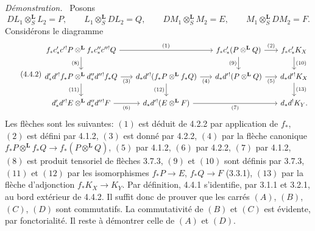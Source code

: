 \documentclass[11pt]{article}
\newenvironment{prooftext}[1][Proof]{\par\noindent\emph{#1.}\ }{\par\medskip}
\begin{document}
\begin{prooftext}[Démonstration]
Posons
\[
DL_1\otimes_S^{\mathbf L}L_2=P,\qquad
L_1\otimes_S^{\mathbf L}DL_2=Q,\qquad
DM_1\otimes_S^{\mathbf L}M_2=E,\qquad
M_1\otimes_S^{\mathbf L}DM_2=F.
\]
Considérons le diagramme
\begin{equation}
\tag{4.4.2}
\begin{tikzcd}[column sep=1.6em,row sep=1.7em]
f_*c'_*c'{}^!P\otimes^{\mathbf L} f_*c''_*c''{}^!Q
 \arrow[rr,"(1)"] \arrow[d,"(8)"'] &&
f_*c'_*(P\otimes^{\mathbf L}Q)
 \arrow[r,"(2)"] \arrow[d,"(9)"'] &
f_*c'_*K_X \arrow[d,"(10)"] \\
d'_*d'{}^!f_*P\otimes^{\mathbf L} d''_*d''{}^!f_*Q
 \arrow[r,"(3)"'] \arrow[d,"(11)"'] &
d_*d'{}^!(f_*P\otimes^{\mathbf L} f_*Q)
 \arrow[r,"(4)"'] \arrow[d,"(12)"'] &
d_*d'{}^!(P\otimes^{\mathbf L}Q)
 \arrow[r,"(5)"'] &
d_*d'{}^!K_X \arrow[d,"(13)"]\\
d'_*d'{}^!E\otimes^{\mathbf L}d''_*d''{}^!F
 \arrow[r,"(6)"'] &
d_*d'{}^!(E\otimes^{\mathbf L}F)
 \arrow[rr,"(7)"'] &&
d_*d^!K_Y .
\end{tikzcd}
\end{equation}
Les flèches sont les suivantes: $(1)$ est déduit de 4.2.2 par application de $f_*$, $(2)$ est défini par 4.1.2, $(3)$ est donné par 4.2.2, $(4)$ par la flèche canonique $f_*P\otimes^{\mathbf L}f_*Q\longrightarrow f_*(P\otimes^{\mathbf L}Q)$, $(5)$ par 4.1.2, $(6)$ par 4.2.2, $(7)$ par 4.1.2, $(8)$ est produit tensoriel de flèches 3.7.3, $(9)$ et $(10)$ sont définis par 3.7.3, $(11)$ et $(12)$ par les isomorphismes $f_*P\longrightarrow E$, $f_*Q\longrightarrow F$ (3.3.1), $(13)$ par la flèche d'adjonction $f_*K_X\longrightarrow K_Y$. Par définition, 4.4.1 s'identifie, par 3.1.1 et 3.2.1, au bord extérieur de 4.4.2. Il suffit donc de prouver que les carrés $(A)$, $(B)$, $(C)$, $(D)$ sont commutatifs. La commutativité de $(B)$ et $(C)$ est évidente, par fonctorialité. Il reste à démontrer celle de $(A)$ et $(D)$.


\end{prooftext}
\end{document}

